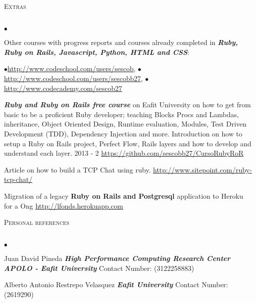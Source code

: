 \documentclass[a4paper]{article}
\newcommand{\lineunder}{\vspace*{-8pt} \\ \hspace*{-18pt} \hrulefill \\}
\newcommand{\header}[1]{{\hspace*{-15pt}\vspace*{6pt}
\textsc{#1}} \vspace*{-6pt} \lineunder}
\newenvironment{achievements}{\begin{list}{$\bullet$}{\topsep 0pt \itemsep
-2pt}}{\vspace*{4pt}\end{list}}
\newcommand{\programming}[1]{{\textbf{#1}}}
\newcommand{\emphasys}[1]{\textbf{\emph{#1}}}
\begin{document}
\header{Extras}
\begin{achievements}
\item{Other courses with progress reports and courses already completed in \emphasys{Ruby, Ruby on Rails, Javascript, Python, HTML and CSS}:}\\
\begin{center}
$\bullet$\url{http://www.codeschool.com/users/sescob},
$\bullet$\url{http://www.codeschool.com/users/sescobb27},
$\bullet$\url{http://www.codecademy.com/sescob27}
\end{center}
\item{\emphasys{Ruby and Ruby on Rails free course} on Eafit University on how to get from basic to be a proficient Ruby developer; teaching Blocks Procs and Lambdas, inheritance, Object Oriented Design, Runtime evaluation, Modules, Test Driven Development (TDD), Dependency Injection and more. Introduction on how to setup a Ruby on Rails project, Perfect Flow, Rails layers and how to develop and understand each layer. 2013 - 2 \url{https://github.com/sescobb27/CursoRubyRoR}}
\item{Article on how to build a TCP Chat using ruby. \url{http://www.sitepoint.com/ruby-tcp-chat/}}
\item{Migration of a legacy \programming{Ruby on Rails and Postgresql} application to Heroku for a Ong \url{http://lfonds.herokuapp.com}}
\end{achievements}
\header{Personal references}
\begin{achievements}
\item{Juan David Pineda \emphasys{High Performance Computing Research Center APOLO - Eafit University} Contact Number: (3122258883)}
\item{Alberto Antonio Restrepo Velasquez  \emphasys{Eafit University} Contact Number: (2619290)}
\end{achievements}
\end{document}
